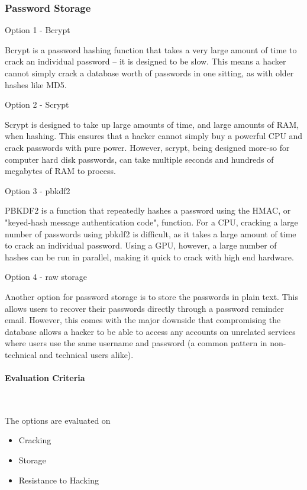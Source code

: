 \documentclass[letterpaper, 10pt, draftclsnofoot, compsoc, onecolumn]{IEEEtran}
\begin{document}
{\subsubsection{Password Storage}
{\noindent \par}
{\noindent Option 1 - Bcrypt \par}
{\noindent Bcrypt is a password hashing function that takes a very large amount of time to crack
an individual password -- it is designed to be slow. This means a hacker cannot simply crack
a database worth of passwords in one sitting, as with older hashes like MD5. \par}
{\noindent Option 2 - Scrypt \par}
{\noindent Scrypt is designed to take up large amounts of time, and large amounts of RAM,
when hashing. This ensures that a hacker cannot simply buy a powerful CPU and crack passwords with
pure power. However, scrypt, being designed more-so for computer hard disk passwords, can take
multiple seconds and hundreds of megabytes of RAM to process. \par}
{\noindent Option 3 - pbkdf2 \par}
{\noindent PBKDF2 is a function that repeatedly hashes a password using the HMAC, or "keyed-hash
message authentication code", function. For a CPU, cracking a large number of passwords using pbkdf2
is difficult, as it takes a large amount of time to crack an individual password. Using a GPU,
however, a large number of hashes can be run in parallel, making it quick to crack with high end hardware. \par}
{\noindent Option 4 - raw storage \par}
{\noindent Another option for password storage is to store the passwords in plain text. This allows
users to recover their passwords directly through a password reminder email. However, this comes with
the major downside that compromising the database allows a hacker to be able to access any
accounts on unrelated services where users use the same username and password (a common pattern
in non-technical and technical users alike). \par}

\medskip
\newpage
\paragraph{Evaluation Criteria} ~\\
{\noindent The options are evaluated on

\begin{itemize}
\item Cracking
\item Storage
\item Resistance to Hacking
\end{itemize}

}}
\end{document}
